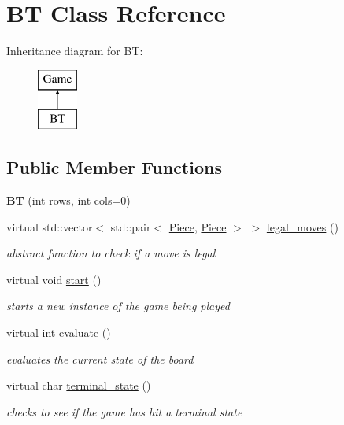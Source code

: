 \hypertarget{class_b_t}{}\section{BT Class Reference}
\label{class_b_t}
Inheritance diagram for BT\+:\begin{figure}[H]
\begin{center}
\leavevmode
\includegraphics[height=2.000000cm]{class_b_t}
\end{center}
\end{figure}
\subsection*{Public Member Functions}
\begin{DoxyCompactItemize}
\item 
\mbox{\label{class_b_t_ace122849e5dcf81df2748b44bec34f97}} 
{\bfseries BT} (int rows, int cols=0)
\item 
virtual std\+::vector$<$ std\+::pair$<$ \hyperlink{class_piece}{Piece}, \hyperlink{class_piece}{Piece} $>$ $>$ \hyperlink{class_b_t_a4d3ad59ecb429b37c983986cc7802b17}{legal\+\_\+moves} ()
\begin{DoxyCompactList}\small\item\em abstract function to check if a move is legal \end{DoxyCompactList}\item 
virtual void \hyperlink{class_b_t_acb87d577e00a5fa66ddb653c697e3ad4}{start} ()
\begin{DoxyCompactList}\small\item\em starts a new instance of the game being played \end{DoxyCompactList}\item 
virtual int \hyperlink{class_b_t_a330840afc9271716265fb65eb037d351}{evaluate} ()
\begin{DoxyCompactList}\small\item\em evaluates the current state of the board \end{DoxyCompactList}\item 
virtual char \hyperlink{class_b_t_a5b09c0eb2d583ae2141aeefe18545e5c}{terminal\+\_\+state} ()
\begin{DoxyCompactList}\small\item\em checks to see if the game has hit a terminal state \end{DoxyCompactList}\end{DoxyCompactItemize}
